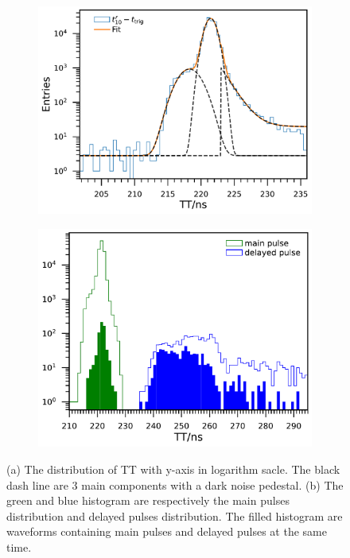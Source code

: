 \begin{figure}[!htbp]
    \centering
    \begin{subfigure}[t]{\SF\textwidth}
        \includegraphics[width=\textwidth]{figures/method/triggerTTSLog.pdf}
        \caption{}%
        \label{fig:triggerTTSLog}
    \end{subfigure}
    \begin{subfigure}[t]{\SF\textwidth}
        \includegraphics[width=\textwidth]{figures/method/triggerDelayedPulse.pdf}
        \caption{}%
        \label{fig:triggerTTlatepulse}
    \end{subfigure}
    \caption{(a) The distribution of TT with y-axis in logarithm sacle. The black dash line are 3 main components with a dark noise pedestal. (b) The green and blue histogram are respectively the main pulses distribution and delayed pulses distribution. The filled histogram are waveforms containing main pulses and delayed pulses at the same time.}
\end{figure}

